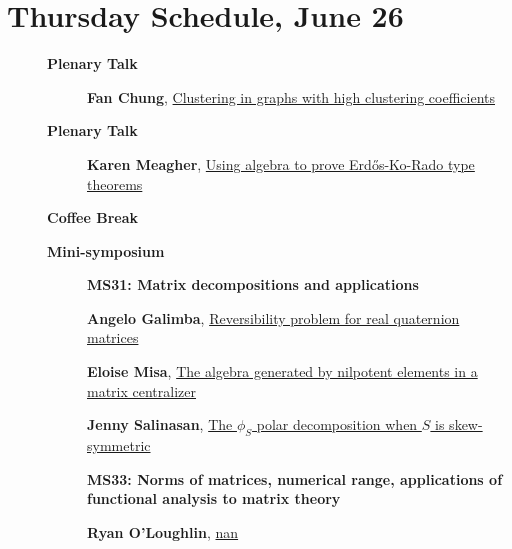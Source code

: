 \documentclass[ILAS2025-program.tex]{subfiles}
\begin{document}
\section{Thursday Schedule, June 26}
    
    \begin{description}
    \item[] \textbf{Plenary Talk} 
    \begin{description}
        \item[] \hypertarget{up0006}{}\textbf{Fan Chung}, \hyperlink{down0006}{Clustering in graphs with high clustering coefficients}
        \end{description}
        \item[] \textbf{Plenary Talk} 
    \begin{description}
        \item[] \hypertarget{up0007}{}\textbf{Karen Meagher}, \hyperlink{down0007}{Using algebra to prove Erd\H{o}s-Ko-Rado type theorems
}
        \end{description}
        \item[] \textbf{Coffee Break} 
    \item[] \textbf{Mini-symposium} 
    \begin{description}
    \item[] {\color{mstitle}\textbf{MS31: Matrix decompositions and applications}} 
    \item[] \hypertarget{up0274}{}\textbf{Angelo Galimba}, \hyperlink{down0274}{Reversibility problem for real quaternion matrices}
        \item[] \hypertarget{up0275}{}\textbf{Eloise Misa}, \hyperlink{down0275}{The algebra generated by nilpotent elements in a matrix centralizer}
        \item[] \hypertarget{up0276}{}\textbf{Jenny Salinasan}, \hyperlink{down0276}{The $\phi_S$ polar decomposition when $S$ is skew-symmetric}
        \end{description}
    \begin{description}
    \item[] {\color{mstitle}\textbf{MS33: Norms of matrices, numerical range, applications of functional analysis to matrix theory}} 
    \item[] \hypertarget{up0277}{}\textbf{Ryan O'Loughlin}, \hyperlink{down0277}{nan}

\end{description}
\end{description}
\end{document}
